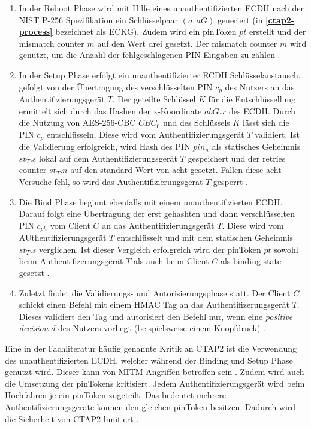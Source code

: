\begin{enumerate}
    \item In der Reboot Phase wird mit Hilfe eines unauthentifizierten \ac{ECDH} nach der NIST P-256 Spezifikation ein Schlüsselpaar $(a, aG)$ generiert (in \textbf{\ref{ctap2-process}} bezeichnet als ECKG). Zudem wird ein pinToken $pt$ erstellt und der mismatch counter $m$ auf den Wert drei gesetzt. Der mismatch counter $m$ wird genutzt, um die Anzahl der fehlgeschlagenen PIN Eingaben zu zählen \cite{barbosa2021provable}.  
    \item In der Setup Phase erfolgt ein unauthentifizierter \ac{ECDH} Schlüsselaustausch, gefolgt von der Übertragung des verschlüsselten PIN $c_p$ des Nutzers an das Authentifizierungsgerät $T$. Der geteilte Schlüssel $K$ für die Entschlüssellung ermittelt sich durch das Hashen der x-Koordinate $abG.x$ des \ac{ECDH}. Durch die Nutzung von AES-256-CBC $CBC_0$ und des Schlüssels $K$ lässt sich die PIN $c_p$ entschlüsseln. Diese wird vom Authentifizierungsgerät $T$ validiert. Ist die Validierung erfolgreich, wird Hash des PIN $pin_u$ als statisches Geheimnis $st_T.s$ lokal auf dem Authentifizierungsgerät $T$ gespeichert und der retries counter $st_T.n$ auf den standard Wert von acht gesetzt. Fallen diese acht Versuche fehl, so wird das Authentifizierungsgerät $T$ gesperrt \cite{barbosa2021provable} \cite{bindel2022fido2}.
    \item Die Bind Phase beginnt ebenfalls mit einem unauthentifizierten \ac{ECDH}. Darauf folgt eine Übertragung der erst gehashten und dann verschlüsselten PIN $c_{ph}$ vom Client $C$ an das Authentifizierungsgerät $T$. Diese wird vom AUthentifizierungsgerät $T$ entschlüsselt und mit dem statischen Geheimnis $st_T.s$ verglichen. Ist dieser Vergleich erfolgreich wird der pinToken $pt$ sowohl beim Authentifizerungsgerät $T$ als auch beim Client $C$ als binding state gesetzt \cite{barbosa2021provable} \cite{bindel2022fido2}.
    \item Zuletzt findet die Validierungs- und Autorisierungsphase statt. Der Client $C$ schickt einen Befehl mit einem HMAC Tag an das Authentifizerungsgerät $T$. Dieses validiert den Tag und autorisiert den Befehl nur, wenn eine \textit{positive decision} $d$ des Nutzers vorliegt (beispielsweise einem Knopfdruck) \cite{barbosa2021provable} \cite{bindel2022fido2}.
\end{enumerate}

Eine in der Fachliteratur häufig genannte Kritik an \ac{CTAP2} ist die Verwendung des unauthentifizierten \ac{ECDH}, welcher während der Binding und Setup Phase genutzt wird. Dieser kann von \ac{MITM} Angriffen betroffen sein \cite{barbosa2021provable}.
Zudem wird auch die Umsetzung der pinTokens kritisiert. Jedem Authentifizierungsgerät wird beim Hochfahren je ein pinToken zugeteilt. Das bedeutet mehrere Authentifizierungsgeräte können den gleichen pinToken besitzen. Dadurch wird die Sicherheit von \ac{CTAP2} limitiert \cite{barbosa2021provable}.

